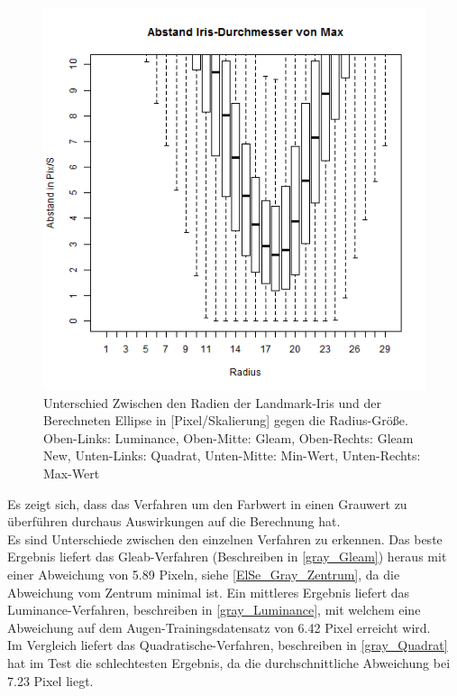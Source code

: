 \begin{figure}
	\includegraphics[width=0.32\linewidth]{Eye_Img_Box/Max_Radius_I}
	\caption{Unterschied Zwischen den Radien der Landmark-Iris und der Berechneten Ellipse in [Pixel/Skalierung] gegen die Radius-Größe.\\ Oben-Links: Luminance, Oben-Mitte: Gleam, Oben-Rechts: Gleam New, Unten-Links: Quadrat, Unten-Mitte: Min-Wert, Unten-Rechts: Max-Wert}
	\label{ElSe_Gray_Iris}
\end{figure}
Es zeigt sich, dass das Verfahren um den Farbwert in einen Grauwert zu überführen durchaus Auswirkungen auf die Berechnung hat.\\
Es sind Unterschiede zwischen den einzelnen Verfahren zu erkennen. Das beste Ergebnis liefert das Gleab-Verfahren (Beschreiben in \autoref{gray_Gleam}) heraus mit einer Abweichung von 5.89 Pixeln, siehe \autoref{ElSe_Gray_Zentrum}, da die Abweichung vom Zentrum minimal ist. Ein mittleres Ergebnis liefert das Luminance-Verfahren, beschreiben in \autoref{gray_Luminance}, mit welchem eine Abweichung auf dem Augen-Trainingsdatensatz von 6.42 Pixel erreicht wird.\\
Im Vergleich liefert das Quadratische-Verfahren, beschreiben in \autoref{gray_Quadrat} hat im Test die schlechtesten Ergebnis, da die durchschnittliche Abweichung bei 7.23 Pixel liegt.\\
